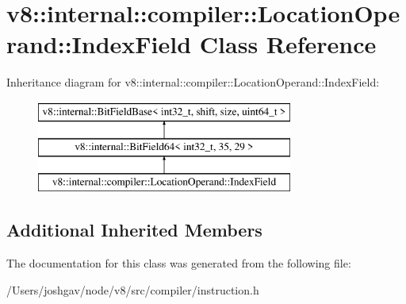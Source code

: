 \hypertarget{classv8_1_1internal_1_1compiler_1_1_location_operand_1_1_index_field}{}\section{v8\+:\+:internal\+:\+:compiler\+:\+:Location\+Operand\+:\+:Index\+Field Class Reference}
\label{classv8_1_1internal_1_1compiler_1_1_location_operand_1_1_index_field}
Inheritance diagram for v8\+:\+:internal\+:\+:compiler\+:\+:Location\+Operand\+:\+:Index\+Field\+:\begin{figure}[H]
\begin{center}
\leavevmode
\includegraphics[height=3.000000cm]{classv8_1_1internal_1_1compiler_1_1_location_operand_1_1_index_field}
\end{center}
\end{figure}
\subsection*{Additional Inherited Members}


The documentation for this class was generated from the following file\+:\begin{DoxyCompactItemize}
\item 
/\+Users/joshgav/node/v8/src/compiler/instruction.\+h\end{DoxyCompactItemize}
